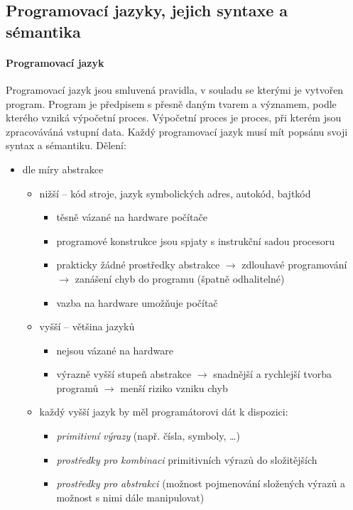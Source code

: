 \documentclass[10pt,a4paper]{article}
\begin{document}
  \subsection{Programovací jazyky, jejich syntaxe a sémantika}
    \paragraph{Programovací jazyk}
    Programovací jazyk jsou smluvená pravidla, v souladu se kterými je vytvořen program. Program je předpisem s přesně daným tvarem a významem, podle kterého vzniká výpočetní proces. Výpočetní proces je proces, při kterém jsou zpracováváná vstupní data. Každý programovací jazyk musí mít popsánu svoji syntax a sémantiku.
    Dělení:
    \begin{itemize}
      \item dle míry abstrakce
      \begin{itemize}
        \item nižší -- kód stroje, jazyk symbolických adres, autokód, bajtkód
        \begin{itemize}
          \item těsně vázané na hardware počítače
          \item programové konstrukce jsou spjaty s instrukční sadou procesoru
          \item prakticky žádné prostředky abstrakce $\rightarrow$ zdlouhavé programování $\rightarrow$ zanášení chyb do programu (špatně odhalitelné)
          \item vazba na hardware umožňuje počítač 
        \end{itemize}
        \item vyšší -- většina jazyků
        \begin{itemize}
          \item nejsou vázané na hardware
          \item výrazně vyšší stupeň abstrakce $\rightarrow$ snadnější a rychlejší tvorba programů $\rightarrow$ menší riziko vzniku chyb
          \end{itemize}
          \item každý vyšší jazyk by měl programátorovi dát k dispozici:
          \begin{itemize}
            \item \textit{primitivní výrazy} (např. čísla, symboly, \ldots)
            \item \textit{prostředky pro kombinaci} primitivních výrazů do složitějších
            \item \textit{prostředky pro abstrakci} (možnost pojmenování složených výrazů a možnost s nimi dále manipulovat)

\end{itemize}
\end{itemize}
\end{itemize}
\end{document}
